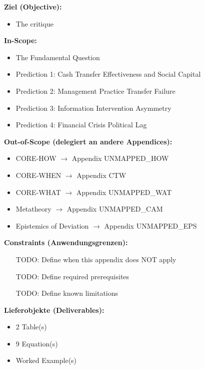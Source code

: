 
\begin{tcolorbox}[
    colback=orange!5!white,
    colframe=orange!75!black,
    title={\textbf{Appendix Scope: Ziel / In-Scope / Out-of-Scope / Constraints}},
    fonttitle=\bfseries
]

\textbf{Ziel (Objective):}
\begin{itemize}[nosep]
    \item The critique
\end{itemize}

\textbf{In-Scope:}
\begin{itemize}[nosep]
    \item The Fundamental Question
    \item Prediction 1: Cash Transfer Effectiveness and Social Capital
    \item Prediction 2: Management Practice Transfer Failure
    \item Prediction 3: Information Intervention Asymmetry
    \item Prediction 4: Financial Crisis Political Lag
\end{itemize}

\textbf{Out-of-Scope (delegiert an andere Appendices):}
\begin{itemize}[nosep]
    \item CORE-HOW $\rightarrow$ Appendix UNMAPPED_HOW
    \item CORE-WHEN $\rightarrow$ Appendix CTW
    \item CORE-WHAT $\rightarrow$ Appendix UNMAPPED_WAT
    \item Metatheory $\rightarrow$ Appendix UNMAPPED_CAM
    \item Epistemics of Deviation $\rightarrow$ Appendix UNMAPPED_EPS
\end{itemize}

\textbf{Constraints (Anwendungsgrenzen):}
\begin{itemize}[nosep]
    \item [TODO: Define when this appendix does NOT apply]
    \item [TODO: Define required prerequisites]
    \item [TODO: Define known limitations]
\end{itemize}

\textbf{Lieferobjekte (Deliverables):}
\begin{itemize}[nosep]
    \item 2 Table(s)
    \item 9 Equation(s)
    \item Worked Example(s)
\end{itemize}

\end{tcolorbox}




